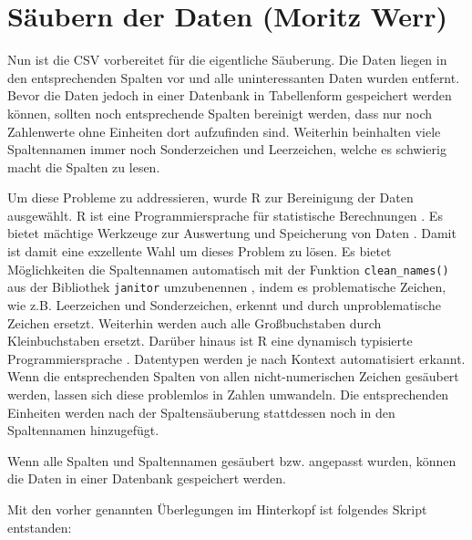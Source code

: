 \chapter{Säubern der Daten (Moritz Werr)}

Nun ist die CSV vorbereitet für die eigentliche Säuberung. Die Daten liegen in den entsprechenden Spalten vor und alle uninteressanten Daten wurden entfernt.
Bevor die Daten jedoch in einer Datenbank in Tabellenform gespeichert werden können, sollten noch entsprechende Spalten bereinigt werden, dass nur noch Zahlenwerte ohne Einheiten dort aufzufinden sind.
Weiterhin beinhalten viele Spaltennamen immer noch Sonderzeichen und Leerzeichen, welche es schwierig macht die Spalten zu lesen.

Um diese Probleme zu addressieren, wurde R zur Bereinigung der Daten ausgewählt.
R ist eine Programmiersprache für statistische Berechnungen \cite{noauthor_r_nodate}. Es bietet mächtige Werkzeuge zur Auswertung und Speicherung von Daten \cite{noauthor_r_nodate}. Damit ist damit eine exzellente Wahl um dieses Problem zu lösen.
Es bietet Möglichkeiten die Spaltennamen automatisch mit der Funktion  \lstinline |clean_names()| aus der Bibliothek \lstinline|janitor| umzubenennen \cite{noauthor_janitor_nodate}, indem es problematische Zeichen, wie z.B. Leerzeichen und Sonderzeichen, erkennt und durch unproblematische Zeichen ersetzt.
Weiterhin werden auch alle Großbuchstaben durch Kleinbuchstaben ersetzt.
Darüber hinaus ist R eine dynamisch typisierte Programmiersprache \cite{ewendorf_algorithmic_2019}. Datentypen werden je nach Kontext automatisiert erkannt.
Wenn die entsprechenden Spalten von allen nicht-numerischen Zeichen gesäubert werden, lassen sich diese problemlos in Zahlen umwandeln.
Die entsprechenden Einheiten werden nach der Spaltensäuberung stattdessen noch in den Spaltennamen hinzugefügt.

Wenn alle Spalten und Spaltennamen gesäubert bzw. angepasst wurden, können die Daten in einer Datenbank gespeichert werden.

Mit den vorher genannten Überlegungen im Hinterkopf ist folgendes Skript entstanden: 


\lstset{
	breaklines=true,         %
	breakatwhitespace=false, %
	basicstyle=\ttfamily,    %
}

